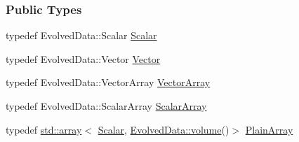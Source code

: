 \subsubsection*{Public Types}
\begin{DoxyCompactItemize}
\item 
typedef Evolved\+Data\+::\+Scalar \mbox{\hyperlink{classregu_system_3_01_newtonian_3_01typename_01_evolved_data_1_1_scalar_01_4_00_01_evolved_data_00_01_regularitor_01_4_a6993f135075541f441a7642845b183a5}{Scalar}}
\item 
typedef Evolved\+Data\+::\+Vector \mbox{\hyperlink{classregu_system_3_01_newtonian_3_01typename_01_evolved_data_1_1_scalar_01_4_00_01_evolved_data_00_01_regularitor_01_4_a21c05c4ff0b6317622c03f389ccefa85}{Vector}}
\item 
typedef Evolved\+Data\+::\+Vector\+Array \mbox{\hyperlink{classregu_system_3_01_newtonian_3_01typename_01_evolved_data_1_1_scalar_01_4_00_01_evolved_data_00_01_regularitor_01_4_a3b84b504bd689b0a0f6543e885772a8d}{Vector\+Array}}
\item 
typedef Evolved\+Data\+::\+Scalar\+Array \mbox{\hyperlink{classregu_system_3_01_newtonian_3_01typename_01_evolved_data_1_1_scalar_01_4_00_01_evolved_data_00_01_regularitor_01_4_a07a1e7c26da06051d8184993828ede8c}{Scalar\+Array}}
\item 
typedef \mbox{\hyperlink{classparticle_system_a1817956f802188c82c12c223c32bd28a}{std\+::array}}$<$ \mbox{\hyperlink{classregu_system_3_01_newtonian_3_01typename_01_evolved_data_1_1_scalar_01_4_00_01_evolved_data_00_01_regularitor_01_4_a6993f135075541f441a7642845b183a5}{Scalar}}, \mbox{\hyperlink{classregu_system_a4260b237d36d137b01504c0effd385fa}{Evolved\+Data\+::volume}}()$>$ \mbox{\hyperlink{classregu_system_3_01_newtonian_3_01typename_01_evolved_data_1_1_scalar_01_4_00_01_evolved_data_00_01_regularitor_01_4_a26da8a1ed92e5aced3615da524ef37b3}{Plain\+Array}}
\end{DoxyCompactItemize}
